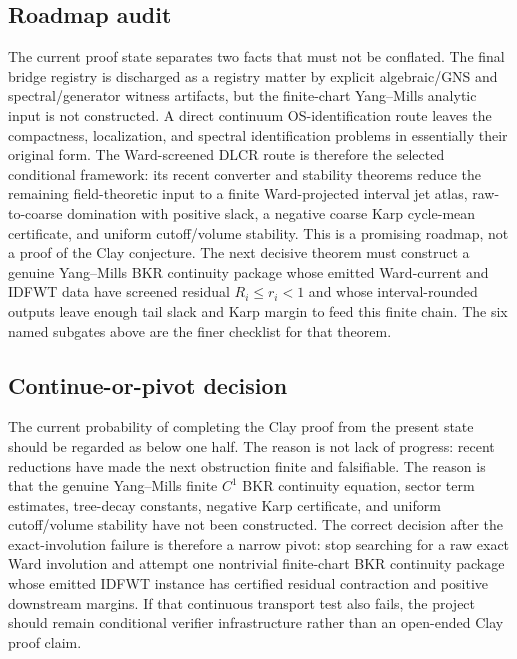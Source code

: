 \subsection{Roadmap audit}
The current proof state separates two facts that must not be conflated. The
final bridge registry is discharged as a registry matter by explicit
algebraic/GNS and spectral/generator witness artifacts, but the finite-chart
Yang--Mills analytic input is not constructed. A direct continuum
OS-identification route leaves the compactness, localization, and spectral
identification problems in essentially their original form. The Ward-screened
DLCR route is therefore the selected conditional framework: its recent
converter and stability theorems reduce the remaining field-theoretic input to
a finite Ward-projected interval jet atlas, raw-to-coarse domination with
positive slack, a negative coarse Karp cycle-mean certificate, and uniform
cutoff/volume stability. This is a promising roadmap, not a proof of the Clay
conjecture. The next decisive theorem must construct a genuine Yang--Mills
BKR continuity package whose emitted Ward-current and IDFWT data have screened
residual $R_i\le r_i<1$ and whose interval-rounded outputs leave enough tail
slack and Karp margin to feed this finite chain. The six named subgates above
are the finer checklist for that theorem.

\subsection{Continue-or-pivot decision}
The current probability of completing the Clay proof from the present state
should be regarded as below one half. The reason is not lack of progress:
recent reductions have made the next obstruction finite and falsifiable. The
reason is that the genuine Yang--Mills finite \(C^1\) BKR continuity equation,
sector term estimates, tree-decay constants, negative Karp certificate, and
uniform cutoff/volume stability have not been constructed. The correct
decision after the exact-involution failure is therefore a narrow pivot: stop
searching for a raw exact Ward involution and attempt one nontrivial
finite-chart BKR continuity package whose emitted IDFWT instance has certified
residual contraction and positive downstream margins. If that
continuous transport test also fails, the project should remain conditional
verifier infrastructure rather than an open-ended Clay proof claim.

